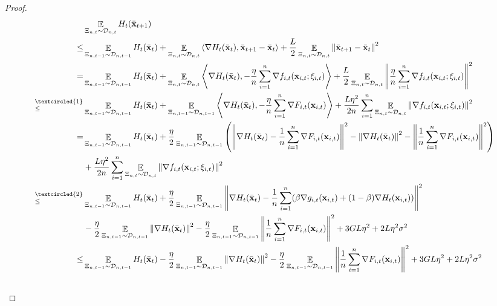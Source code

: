 \documentclass{article}
\begin{document}
\begin{proof}

\begin{align}
\nonumber
& \EE_{ \Xi_{n,t} \sim \Dcal_{n,t} } H_t(\bar{\x}_{t+1}) \\ \nonumber
\le & \EE_{ \Xi_{n,t-1} \sim \Dcal_{n,t-1} } H_t(\bar{\x}_t) + \EE_{ \Xi_{n,t} \sim \Dcal_{n,t} }\lrangle{\nabla H_t(\bar{\x}_t), \bar{\x}_{t+1} - \bar{\x}_t} + \frac{L}{2}\EE_{ \Xi_{n,t} \sim \Dcal_{n,t} }\lrnorm{\bar{\x}_{t+1} - \bar{\x}_t}^2 \\ \nonumber
= & \EE_{ \Xi_{n,t-1} \sim \Dcal_{n,t-1} } H_t(\bar{\x}_t) + \EE_{ \Xi_{n,t} \sim \Dcal_{n,t} }\lrangle{\nabla H_t(\bar{\x}_t), -\frac{\eta}{n}\sum_{i=1}^n \nabla f_{i,t}(\x_{i,t};\xi_{i,t})} + \frac{L}{2} \EE_{ \Xi_{n,t} \sim \Dcal_{n,t} }\lrnorm{\frac{\eta}{n}\sum_{i=1}^n \nabla f_{i,t}(\x_{i,t};\xi_{i,t})}^2 \\ \nonumber
\refabovecir{\le}{\textcircled{1}} & \EE_{ \Xi_{n,t-1} \sim \Dcal_{n,t-1} } H_t(\bar{\x}_t) + \EE_{ \Xi_{n,t-1} \sim \Dcal_{n,t-1} } \lrangle{\nabla H_t(\bar{\x}_t), -\frac{\eta}{n}\sum_{i=1}^n \nabla F_{i,t}(\x_{i,t})} + \frac{L\eta^2}{2n}\sum_{i=1}^n\EE_{ \Xi_{n,t} \sim \Dcal_{n,t} }\lrnorm{ \nabla f_{i,t}(\x_{i,t};\xi_{i,t})}^2 \\ \nonumber
= & \EE_{ \Xi_{n,t-1} \sim \Dcal_{n,t-1} } H_t(\bar{\x}_t) + \frac{\eta}{2}\EE_{ \Xi_{n,t-1} \sim \Dcal_{n,t-1} } \lrincir{ \lrnorm{\nabla H_t(\bar{\x}_t) -\frac{1}{n}\sum_{i=1}^n \nabla F_{i,t}(\x_{i,t})}^2 - \lrnorm{\nabla H_t(\bar{\x}_t)}^2 - \lrnorm{\frac{1}{n}\sum_{i=1}^n \nabla F_{i,t}(\x_{i,t})}^2 } \\ \nonumber 
& + \frac{L\eta^2}{2n}\sum_{i=1}^n\EE_{ \Xi_{n,t} \sim \Dcal_{n,t} }\lrnorm{ \nabla f_{i,t}(\x_{i,t};\xi_{i,t})}^2 \\ \nonumber
\refabovecir{\le}{\textcircled{2}} & \EE_{ \Xi_{n,t-1} \sim \Dcal_{n,t-1} } H_t(\bar{\x}_t) + \frac{\eta}{2}\EE_{ \Xi_{n,t-1} \sim \Dcal_{n,t-1} } \lrnorm{\nabla H_t(\bar{\x}_t) -\frac{1}{n}\sum_{i=1}^n (\beta \nabla g_{i,t}(\x_{i,t}) + (1-\beta)\nabla H_t(\x_{i,t}))}^2 \\ \nonumber 
& - \frac{\eta}{2}\EE_{ \Xi_{n,t-1} \sim \Dcal_{n,t-1} } \lrnorm{\nabla H_t(\bar{\x}_t)}^2 - \frac{\eta}{2}\EE_{ \Xi_{n,t-1} \sim \Dcal_{n,t-1} } \lrnorm{\frac{1}{n}\sum_{i=1}^n \nabla F_{i,t}(\x_{i,t})}^2 + 3GL\eta^2  + 2L\eta^2 \sigma^2 \\ \nonumber
\le & \EE_{ \Xi_{n,t-1} \sim \Dcal_{n,t-1} } H_t(\bar{\x}_t) - \frac{\eta}{2}\EE_{ \Xi_{n,t-1} \sim \Dcal_{n,t-1} }\lrnorm{\nabla H_t(\bar{\x}_t)}^2 - \frac{\eta}{2}\EE_{ \Xi_{n,t-1} \sim \Dcal_{n,t-1} }\lrnorm{\frac{1}{n}\sum_{i=1}^n \nabla F_{i,t}(\x_{i,t})}^2  + 3GL\eta^2  + 2L\eta^2 \sigma^2 \\ \nonumber

\end{align}
\end{proof}
\end{document}
